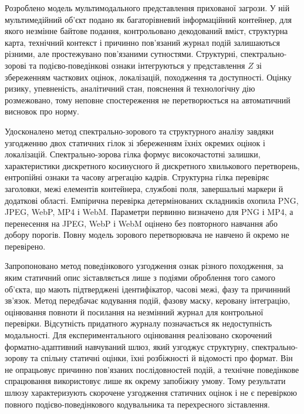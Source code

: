 Розроблено модель мультимодального представлення прихованої загрози. У ній мультимедійний об’єкт подано як багаторівневий інформаційний контейнер, для якого незмінне байтове подання, контрольовано декодований вміст, структурна карта, технічний контекст і причинно пов’язаний журнал подій залишаються різними, але простежувано пов’язаними сутностями. Структурні, спектрально-зорові та подієво-поведінкові ознаки інтегруються у представлення $Z$ зі збереженням часткових оцінок, локалізацій, походження та доступності. Оцінку ризику, упевненість, аналітичний стан, пояснення й технологічну дію розмежовано, тому неповне спостереження не перетворюється на автоматичний висновок про норму.

Удосконалено метод спектрально-зорового та структурного аналізу завдяки узгодженню двох статичних гілок зі збереженням їхніх окремих оцінок і локалізацій. Спектрально-зорова гілка формує високочастотні залишки, характеристики дискретного косинусного й дискретного хвилькового перетворень, ентропійні ознаки та часову агрегацію кадрів. Структурна гілка перевіряє заголовки, межі елементів контейнера, службові поля, завершальні маркери й додаткові області. Емпірична перевірка детермінованих складників охопила PNG, JPEG, WebP, MP4 і WebM. Параметри первинно визначено для PNG і MP4, а перенесення на JPEG, WebP і WebM оцінено без повторного навчання або добору порогів. Повну модель зорового перетворювача не навчено й окремо не перевірено.

Запропоновано метод поведінкового узгодження ознак різного походження, за яким статичний опис зіставляється лише з подіями оброблення того самого об’єкта, що мають підтверджені ідентифікатор, часові межі, фазу та причинний зв’язок. Метод передбачає кодування подій, фазову маску, керовану інтеграцію, оцінювання повноти й посилання на незмінний журнал для контрольної перевірки. Відсутність придатного журналу позначається як недоступність модальності. Для експериментального оцінювання реалізовано скорочений форматно-адаптивний навчуваний шлюз, який узгоджує структурну, спектрально-зорову та спільну статичні оцінки, їхні розбіжності й відомості про формат. Він не опрацьовує причинно пов’язаних послідовностей подій, а технічне поведінкове спрацювання використовує лише як окрему запобіжну умову. Тому результати шлюзу характеризують скорочене узгодження статичних оцінок і не є перевіркою повного подієво-поведінкового кодувальника та перехресного зіставлення.

